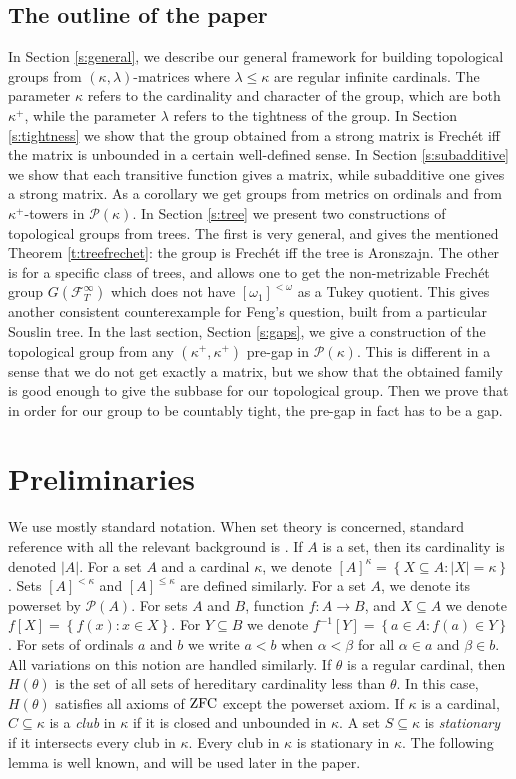 \documentclass{amsart}
\theoremstyle{plain}
\theoremstyle{definition}
\numberwithin{equation}{section}
\renewcommand{\a}{\alpha}
\renewcommand{\b}{\beta}
\renewcommand{\k}{\kappa}
\renewcommand{\o}{\omega}
\renewcommand{\l}{\lambda}
\newcommand{\sst}{\subseteq}
\newcommand{\cp}{\mathcal P}
\newcommand{\ft}{\mathcal F^{\infty}_T}
\newcommand{\set}[1]{\left\{#1\right\}}
\newcommand{\abs}[1]{\left\vert#1\right\vert}
\begin{document}
\subsection{The outline of the paper}
In Section \ref{s:general}, we describe our general framework for building topological groups from $(\k,\l)$-matrices where $\l\le\k$ are regular infinite cardinals.
The parameter $\k$ refers to the cardinality and character of the group, which are both $\k^+$, while the parameter $\l$ refers to the tightness of the group.
In Section \ref{s:tightness} we show that the group obtained from a strong matrix is Frech\'et iff the matrix is unbounded in a certain well-defined sense.
In Section \ref{s:subadditive} we show that each transitive function gives a matrix, while subadditive one gives a strong matrix.
As a corollary we get groups from metrics on ordinals and from $\k^+$-towers in $\cp(\k)$.
In Section \ref{s:tree} we present two constructions of topological groups from trees.
The first is very general, and gives the mentioned Theorem \ref{t:treefrechet}: the group is Frech\'et iff the tree is Aronszajn.
The other is for a specific class of trees, and allows one to get the non-metrizable Frech\'et group $G(\ft)$ which does not have $[\o_1]^{<\o}$ as a Tukey quotient.
This gives another consistent counterexample for Feng's question, built from a particular Souslin tree.
In the last section, Section \ref{s:gaps}, we give a construction of the topological group from any $(\k^+,\k^+)$ pre-gap in $\cp(\k)$.
This is different in a sense that we do not get exactly a matrix, but we show that the obtained family is good enough to give the subbase for our topological group.
Then we prove that in order for our group to be countably tight, the pre-gap in fact has to be a gap.


\section{Preliminaries}\label{s:preliminaries}

We use mostly standard notation.
When set theory is concerned, standard reference with all the relevant background is \cite{jech}.
If $A$ is a set, then its cardinality is denoted $\abs{A}$.
For a set $A$ and a cardinal $\k$, we denote $[A]^{\k}=\set{X\sst A:\abs{X}=\k}$.
Sets $[A]^{<\k}$ and $[A]^{\le\k}$ are defined similarly.
For a set $A$, we denote its powerset by $\mathcal P(A)$.
For sets $A$ and $B$, function $f:A\to B$, and $X\sst A$ we denote $f[X]=\set{f(x):x\in X}$.
For $Y\sst B$ we denote $f^{-1}[Y]=\set{a\in A:f(a)\in Y}$.
For sets of ordinals $a$ and $b$ we write $a<b$ when $\a<\b$ for all $\a\in a$ and $\b\in b$.
All variations on this notion are handled similarly.
If $\theta$ is a regular cardinal, then $H(\theta)$ is the set of all sets of hereditary cardinality less than $\theta$.
In this case, $H(\theta)$ satisfies all axioms of $\rm{ZFC}$ except the powerset axiom.
If $\k$ is a cardinal, $C\sst \k$ is a \emph{club} in $\k$ if it is closed and unbounded in $\k$.
A set $S\sst \k$ is \emph{stationary} if it intersects every club in $\k$.
Every club in $\k$ is stationary in $\k$.
The following lemma is well known, and will be used later in the paper.
\end{document}
